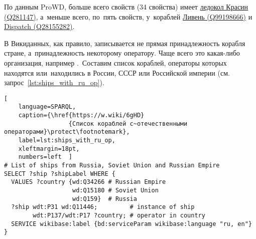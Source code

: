 \newpage
По данным ProWD, больше всего свойств (34 свойства) имеет 
\href{https://www.wikidata.org/wiki/Q281147}{ледокол Красин (Q281147)}, 
а~меньше всего, по~пять свойств, у~кораблей 
\href{https://www.wikidata.org/wiki/Q99198666}{Ливень (Q99198666)} и 
\href{https://www.wikidata.org/wiki/Q28155282}{Dispatch (Q28155282)}.

В Викиданных, как правило, записывается не прямая принадлежность корабля стране, 
а~принадлежность некоторому оператору. 
Чаще всего это какая-либо организация, 
например 
.\, 
Составим список кораблей, 
операторы которых находятся или~находились в России, СССР или Российской империи 
(см. запрос~\ref{lst:ships_with_ru_op}). 



\begin{lstlisting}[ 
    language=SPARQL, 
    caption={\href{https://w.wiki/6gHD}
                  {Cписок кораблей с~отечественными операторами}\protect\footnotemark}, 
    label=lst:ships_with_ru_op,
    xleftmargin=18pt, 
    numbers=left  ]
# List of ships from Russia, Soviet Union and Russian Empire
SELECT ?ship ?shipLabel WHERE {
  VALUES ?country {wd:Q34266 # Russian Empire
                   wd:Q15180 # Soviet Union
                   wd:Q159}  # Russia
  ?ship wdt:P31 wd:Q11446;         # instance of ship
        wdt:P137/wdt:P17 ?country; # operator in country
  SERVICE wikibase:label {bd:serviceParam wikibase:language "ru, en"}
}
\end{lstlisting}

